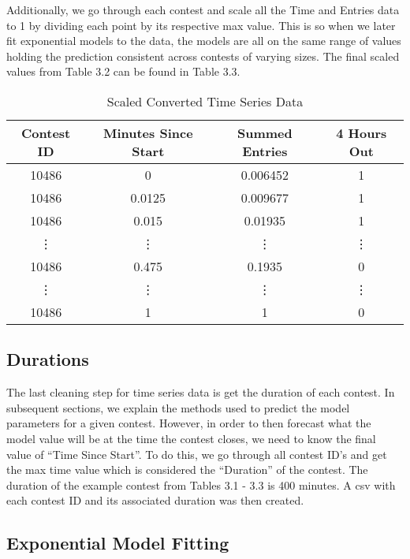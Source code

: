 Additionally, we go through each contest and scale all the Time and Entries data to 1 by dividing each point by its respective max value. This is so when we later fit exponential models to the data, the models are all on the same range of values holding the prediction consistent across contests of varying sizes.  The final scaled values from Table 3.2 can be found in Table 3.3.

\begin{table}
\begin{center}
\begin{tabular}{| c | c | c | c |}
\hline
 \textbf{Contest ID} & \textbf{Minutes Since Start} & \textbf{Summed Entries} & \textbf{4 Hours Out} \\ 
 \hline
 10486 & 0 & 0.006452 & 1 \\  
 \hline
 10486 & 0.0125 & 0.009677 & 1 \\
 \hline
 10486 & 0.015 & 0.01935 & 1 \\
 \hline
 \vdots & \vdots & \vdots & \vdots \\
 \hline
 10486 & 0.475 & 0.1935 & 0 \\
 \hline
 \vdots & \vdots & \vdots & \vdots \\
 \hline
 10486 & 1 & 1 & 0 \\
 \hline
\end{tabular}
\caption{Scaled Converted Time Series Data}
\end{center}
\end{table}

\subsection{Durations}

The last cleaning step for time series data is get the duration of each contest. In subsequent sections, we explain the methods used to predict the model parameters for a given contest. However, in order to then forecast what the model value will be at the time the contest closes, we need to know the final value of ``Time Since Start''. To do this, we go through all contest ID's and get the max time value which is considered the ``Duration'' of the contest. The duration of the example contest from Tables 3.1 - 3.3 is 400 minutes. A csv with each contest ID and its associated duration was then created.

\subsection{Exponential Model Fitting}

